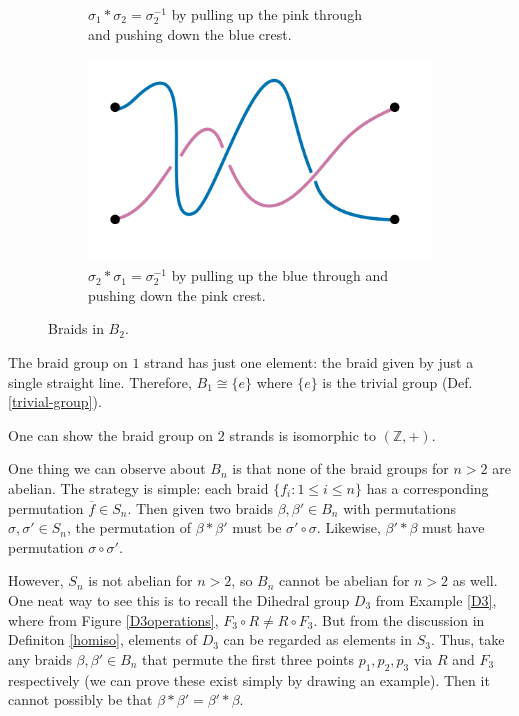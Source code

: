 \documentclass{amsart}
\begin{document}
\begin{example}
\begin{figure}[h!]
\begin{subfigure}{.5\textwidth}
			\caption{\(\sigma_1\ast\sigma_2 = \sigma_2^{-1}\) by pulling up the pink
			through\\ and pushing down the blue crest.}
		\end{subfigure}%
		\begin{subfigure}{.5\textwidth}	  
			\centering
			\includegraphics[width=.9\linewidth]{Inkscape Files/sigma2sigma1.png}
			\caption{\(\sigma_2\ast\sigma_1 = \sigma_2^{-1}\) by pulling up the blue
			through and pushing down the pink crest.}
		\end{subfigure}%
		\caption{Braids in \(B_2\).}
		\label{more-braid-mult}
	\end{figure}
\end{example}

\begin{example}
   The braid group on \(1\) strand has just one element: the braid
	given by just a single straight line. Therefore, \(B_1\cong\{e\}\) where
	\(\{e\}\) is the trivial group (Def. \ref{trivial-group}).

	One can show the braid group on \(2\) strands is isomorphic to
	\((\mathbb{Z}, +)\).
\end{example}

\begin{example}
   One thing we can observe about \(B_n\) is that none of the braid groups
	for \(n > 2\) are abelian.	The strategy is simple: each braid \(\{f_i: 1\le
	i\le n\}\) has a corresponding permutation \(\overline{f}\in S_n\). Then
	given two braids \(\beta, \beta'\in B_n\) with permutations \(\sigma,
	\sigma'\in S_n\), the permutation of \(\beta\ast\beta'\) must be
	\(\sigma'\circ\sigma\). Likewise, \(\beta'\ast\beta\) must have permutation
	\(\sigma\circ\sigma'\).

	However, \(S_n\) is not abelian for \(n > 2\), so \(B_n\) cannot be abelian
	for \(n>2\) as well. One neat way to see this is to recall the Dihedral
	group \(D_3\) from Example \ref{D3}, where from Figure \ref{D3operations},
	\(F_3\circ R \ne R\circ F_3\). But from the discussion in Definiton
	\ref{homiso}, elements of \(D_3\) can be regarded as elements in \(S_3\).
	Thus, take any braids \(\beta, \beta'\in B_n\) that permute the first three
	points \(p_1, p_2, p_3\) via \(R\) and \(F_3\) respectively (we can prove
	these exist simply by drawing an example). Then it cannot possibly be that
	\(\beta\ast\beta' = \beta'\ast\beta\).
\end{example}
\end{document}

